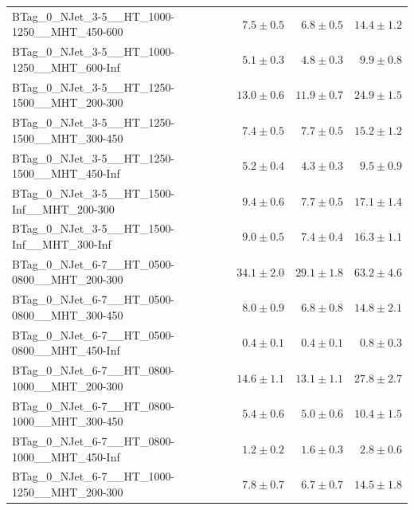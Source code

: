 \documentclass{beamer}
\begin{document}
\begin{frame}
\begin{tabular}{lrrr}
      BTag\_0\_NJet\_3-5\_\_HT\_1000-1250\_\_MHT\_450-600 &               $7.5\pm0.5$&               $6.8\pm0.5$&                  $14.4\pm1.2$ \\
      BTag\_0\_NJet\_3-5\_\_HT\_1000-1250\_\_MHT\_600-Inf &               $5.1\pm0.3$&               $4.8\pm0.3$&                   $9.9\pm0.8$ \\
      BTag\_0\_NJet\_3-5\_\_HT\_1250-1500\_\_MHT\_200-300 &              $13.0\pm0.6$&              $11.9\pm0.7$&                  $24.9\pm1.5$ \\
      BTag\_0\_NJet\_3-5\_\_HT\_1250-1500\_\_MHT\_300-450 &               $7.4\pm0.5$&               $7.7\pm0.5$&                  $15.2\pm1.2$ \\
      BTag\_0\_NJet\_3-5\_\_HT\_1250-1500\_\_MHT\_450-Inf &               $5.2\pm0.4$&               $4.3\pm0.3$&                   $9.5\pm0.9$ \\
       BTag\_0\_NJet\_3-5\_\_HT\_1500-Inf\_\_MHT\_200-300 &               $9.4\pm0.6$&               $7.7\pm0.5$&                  $17.1\pm1.4$ \\
       BTag\_0\_NJet\_3-5\_\_HT\_1500-Inf\_\_MHT\_300-Inf &               $9.0\pm0.5$&               $7.4\pm0.4$&                  $16.3\pm1.1$ \\
      BTag\_0\_NJet\_6-7\_\_HT\_0500-0800\_\_MHT\_200-300 &              $34.1\pm2.0$&              $29.1\pm1.8$&                  $63.2\pm4.6$ \\
      BTag\_0\_NJet\_6-7\_\_HT\_0500-0800\_\_MHT\_300-450 &               $8.0\pm0.9$&               $6.8\pm0.8$&                  $14.8\pm2.1$ \\
      BTag\_0\_NJet\_6-7\_\_HT\_0500-0800\_\_MHT\_450-Inf &               $0.4\pm0.1$&               $0.4\pm0.1$&                   $0.8\pm0.3$ \\
      BTag\_0\_NJet\_6-7\_\_HT\_0800-1000\_\_MHT\_200-300 &              $14.6\pm1.1$&              $13.1\pm1.1$&                  $27.8\pm2.7$ \\
      BTag\_0\_NJet\_6-7\_\_HT\_0800-1000\_\_MHT\_300-450 &               $5.4\pm0.6$&               $5.0\pm0.6$&                  $10.4\pm1.5$ \\
      BTag\_0\_NJet\_6-7\_\_HT\_0800-1000\_\_MHT\_450-Inf &               $1.2\pm0.2$&               $1.6\pm0.3$&                   $2.8\pm0.6$ \\
      BTag\_0\_NJet\_6-7\_\_HT\_1000-1250\_\_MHT\_200-300 &               $7.8\pm0.7$&               $6.7\pm0.7$&                  $14.5\pm1.8$ \\

\end{tabular}
\end{frame}
\end{document}

